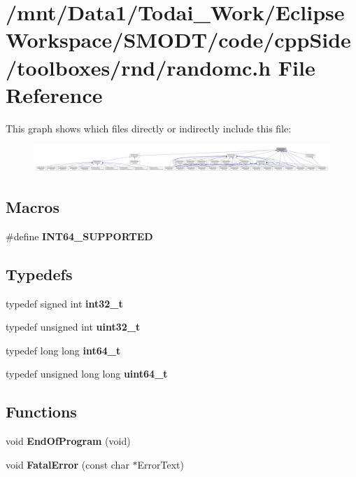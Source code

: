 \section{/mnt/\-Data1/\-Todai\-\_\-\-Work/\-Eclipse\-Workspace/\-S\-M\-O\-D\-T/code/cpp\-Side/toolboxes/rnd/randomc.h File Reference}
\label{toolboxes_2rnd_2randomc_8h}
This graph shows which files directly or indirectly include this file\-:
\nopagebreak
\begin{figure}[H]
\begin{center}
\leavevmode
\includegraphics[width=350pt]{toolboxes_2rnd_2randomc_8h__dep__incl}
\end{center}
\end{figure}
\subsection*{Macros}
\begin{DoxyCompactItemize}
\item 
\#define {\bf I\-N\-T64\-\_\-\-S\-U\-P\-P\-O\-R\-T\-E\-D}
\end{DoxyCompactItemize}
\subsection*{Typedefs}
\begin{DoxyCompactItemize}
\item 
typedef signed int {\bf int32\-\_\-t}
\item 
typedef unsigned int {\bf uint32\-\_\-t}
\item 
typedef long long {\bf int64\-\_\-t}
\item 
typedef unsigned long long {\bf uint64\-\_\-t}
\end{DoxyCompactItemize}
\subsection*{Functions}
\begin{DoxyCompactItemize}
\item 
void {\bf End\-Of\-Program} (void)
\item 
void {\bf Fatal\-Error} (const char $\ast$Error\-Text)
\end{DoxyCompactItemize}


